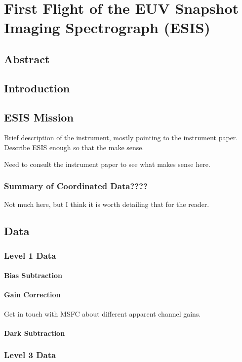 \chapter{First Flight of the EUV Snapshot Imaging Spectrograph (ESIS)}

\section{Abstract}

\section{Introduction}

\section{ESIS Mission}
	Brief description of the instrument, mostly pointing to the instrument paper.  Describe ESIS enough so that the make sense.
	
	Need to consult the instrument paper to see what makes sense here. 
	
\subsection{Summary of Coordinated Data????}
Not much here, but I think it is worth detailing that for the reader.

\section{Data}

\subsection{Level 1 Data}
\subsubsection{Bias Subtraction}
\subsubsection{Gain Correction}
	Get in touch with MSFC about different apparent channel gains.
\subsubsection{Dark Subtraction}

\subsection{Level 3 Data}
